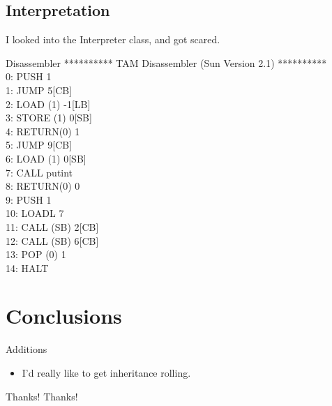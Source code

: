 \documentclass{beamer}
\begin{document}
\subsection{Interpretation}
\begin{frame}
	I looked into the Interpreter class, and got scared.
\end{frame}

\begin{frame}{Disassembler}
********** TAM Disassembler (Sun Version 2.1) **********\\
0:  PUSH        1\\
1:  JUMP        5[CB]\\
2:  LOAD  (1)   -1[LB]\\
3:  STORE (1)   0[SB]\\
4:  RETURN(0)   1\\
5:  JUMP        9[CB]\\
6:  LOAD  (1)   0[SB]\\
7:  CALL        putint  \\
8:  RETURN(0)   0\\
9:  PUSH        1\\
10:  LOADL       7\\
11:  CALL  (SB)  2[CB]\\
12:  CALL  (SB)  6[CB]\\
13:  POP   (0)   1\\
14:  HALT  
\end{frame}


\section{Conclusions}
\begin{frame}{Additions}
	\begin{itemize}
	\item
	I'd \alert{really} like to get inheritance rolling.
	\end{itemize}
\end{frame}

\begin{frame}{Thanks!}
	Thanks!
\end{frame}
\end{document}
